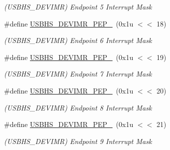 \begin{DoxyCompactItemize}
\begin{DoxyCompactList}\small\item\em (U\+S\+B\+H\+S\+\_\+\+D\+E\+V\+I\+MR) Endpoint 5 Interrupt Mask \end{DoxyCompactList}\item 
\mbox{\label{group__SAMS70__USBHS_gaf2daf6a675d98da260df1647c31a6649}} 
\#define \mbox{\hyperlink{group__SAMS70__USBHS_gaf2daf6a675d98da260df1647c31a6649}{U\+S\+B\+H\+S\+\_\+\+D\+E\+V\+I\+M\+R\+\_\+\+P\+E\+P\+\_}}~(0x1u $<$$<$ 18)
\begin{DoxyCompactList}\small\item\em (U\+S\+B\+H\+S\+\_\+\+D\+E\+V\+I\+MR) Endpoint 6 Interrupt Mask \end{DoxyCompactList}\item 
\mbox{\label{group__SAMS70__USBHS_gaa388c7e97ef7d81bc8080fb440273785}} 
\#define \mbox{\hyperlink{group__SAMS70__USBHS_gaa388c7e97ef7d81bc8080fb440273785}{U\+S\+B\+H\+S\+\_\+\+D\+E\+V\+I\+M\+R\+\_\+\+P\+E\+P\+\_}}~(0x1u $<$$<$ 19)
\begin{DoxyCompactList}\small\item\em (U\+S\+B\+H\+S\+\_\+\+D\+E\+V\+I\+MR) Endpoint 7 Interrupt Mask \end{DoxyCompactList}\item 
\mbox{\label{group__SAMS70__USBHS_ga7c8704094858d52eea2afa2793403877}} 
\#define \mbox{\hyperlink{group__SAMS70__USBHS_ga7c8704094858d52eea2afa2793403877}{U\+S\+B\+H\+S\+\_\+\+D\+E\+V\+I\+M\+R\+\_\+\+P\+E\+P\+\_}}~(0x1u $<$$<$ 20)
\begin{DoxyCompactList}\small\item\em (U\+S\+B\+H\+S\+\_\+\+D\+E\+V\+I\+MR) Endpoint 8 Interrupt Mask \end{DoxyCompactList}\item 
\mbox{\label{group__SAMS70__USBHS_ga870c505db29e638559d066668532a7a5}} 
\#define \mbox{\hyperlink{group__SAMS70__USBHS_ga870c505db29e638559d066668532a7a5}{U\+S\+B\+H\+S\+\_\+\+D\+E\+V\+I\+M\+R\+\_\+\+P\+E\+P\+\_}}~(0x1u $<$$<$ 21)
\begin{DoxyCompactList}\small\item\em (U\+S\+B\+H\+S\+\_\+\+D\+E\+V\+I\+MR) Endpoint 9 Interrupt Mask \end{DoxyCompactList}\item 

\end{DoxyCompactItemize}
